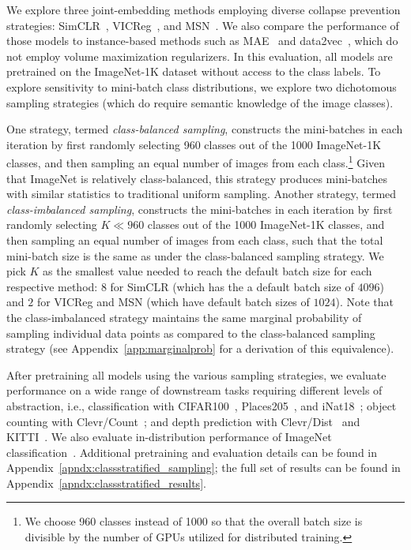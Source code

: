 \documentclass{article} %
\begin{document}
We explore three joint-embedding methods employing diverse collapse prevention strategies: SimCLR~\citep{chen2020simple}, VICReg~\citep{bardes2021vicreg}, and MSN~\citep{assran2022masked}.
We also compare the performance of those models to instance-based methods such as MAE~\citep{he2021masked} and data2vec~\citep{baevski2022data2vec}, which do not employ volume maximization regularizers.
In this evaluation, all models are pretrained on the ImageNet-1K dataset without access to the class labels.
To explore sensitivity to mini-batch class distributions, we explore two dichotomous sampling strategies (which do require semantic knowledge of the image classes).

One strategy, termed \emph{class-balanced sampling}, constructs the mini-batches in each iteration by first randomly selecting 960 classes out of the 1000 ImageNet-1K classes, and then sampling an equal number of images from each class.\footnote{We choose 960 classes instead of 1000 so that the overall batch size is divisible by the number of GPUs utilized for distributed training.}
Given that ImageNet is relatively class-balanced, this strategy produces mini-batches with similar statistics to traditional uniform sampling.
Another strategy, termed \emph{class-imbalanced sampling}, constructs the mini-batches in each iteration by first randomly selecting $K \ll 960$ classes out of the 1000 ImageNet-1K classes, and then sampling an equal number of images from each class, such that the total mini-batch size is the same as under the {class-balanced} sampling strategy. We pick $K$ as the smallest value needed to reach the default batch size for each respective method: $8$ for SimCLR (which has the a default batch size of $4096$) and $2$ for VICReg and MSN (which have default batch sizes of $1024$).
Note that the {class-imbalanced} strategy maintains the same marginal probability of sampling individual data points as compared to the {class-balanced} sampling strategy (see Appendix~\ref{app:marginalprob} for a derivation of this equivalence).


After pretraining all models using the various sampling strategies, we evaluate performance on a wide range of downstream tasks requiring different levels of abstraction, i.e., classification with CIFAR100~\citep{krizhevsky2009learning}, Places205~\citep{zhou2014learning}, and iNat18~\citep{van2018inaturalist}; object counting with Clevr/Count~\citep{johnson2017clevr}; and depth prediction with Clevr/Dist~\citep{johnson2017clevr} and KITTI~\citep{geiger2013vision}.
We also evaluate in-distribution performance of ImageNet classification~\citep{russakovsky2015imagenet,chen2020simple}.
Additional pretraining and evaluation details can be found in Appendix~\ref{apndx:classstratified_sampling}; the full set of results can be found in Appendix~\ref{apndx:classstratified_results}.
\end{document}
